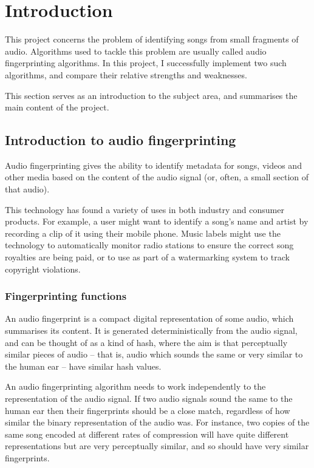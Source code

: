 \documentclass[12pt,a4paper,twoside,openright]{report}
\begin{document}

\chapter{Introduction}
\label{introduction}

This project concerns the problem of identifying songs from small fragments of audio. Algorithms used to tackle this problem are usually called audio fingerprinting algorithms. In this project, I successfully implement two such algorithms, and compare their relative strengths and weaknesses.

This section serves as an introduction to the subject area, and summarises the main content of the project.

\section{Introduction to audio fingerprinting}

Audio fingerprinting gives the ability to identify metadata for songs, videos and other media based on the content of the audio signal (or, often, a small section of that audio).

This technology has found a variety of uses in both industry and consumer products. For example, a user might want to identify a song's name and artist by recording a clip of it using their mobile phone. Music labels might use the technology to automatically monitor radio stations to ensure the correct song royalties are being paid, or to use as part of a watermarking system to track copyright violations.


\subsection{Fingerprinting functions}

An audio fingerprint is a compact digital representation of some audio, which summarises its content. It is generated deterministically from the audio signal, and can be thought of as a kind of hash, where the aim is that perceptually similar pieces of audio -- that is, audio which sounds the same or very similar to the human ear -- have similar hash values.

An audio fingerprinting algorithm needs to work independently to the representation of the audio signal. If two audio signals sound the same to the human ear then their fingerprints should be a close match, regardless of how similar the binary representation of the audio was. For instance, two copies of the same song encoded at different rates of compression will have quite different representations but are very perceptually similar, and so should have very similar fingerprints.
\end{document}
